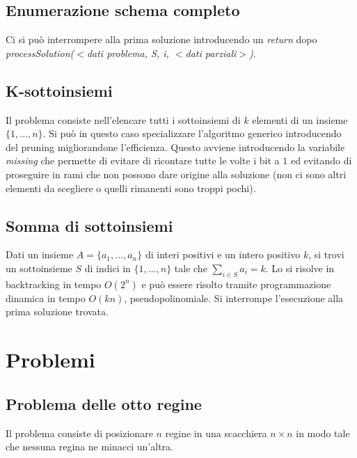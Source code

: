 \subsection{Enumerazione schema completo}

Ci si pu\`o interrompere alla prima soluzione introducendo un \emph{return} dopo \emph{processSolution($<$dati problema, S, i, $<$dati parziali$>$)}.
\subsection{K-sottoinsiemi}
Il problema consiste nell'elencare tutti i sottoinsiemi di $k$ elementi di un insieme $\{1, \dots, n\}$. Si pu\`o in questo caso specializzare l'algoritmo generico introducendo del
pruning migliorandone l'efficienza. Questo avviene introducendo la variabile \emph{missing} che permette di evitare di ricontare tutte le volte i bit a $1$ ed evitando di proseguire
in rami che non possono dare origine alla soluzione (non ci sono altri elementi da scegliere o quelli rimanenti sono troppi pochi).\\

\subsection{Somma di sottoinsiemi}
Dati un insieme $A = \{a_1, \dots, a_n\}$ di interi positivi e un intero positivo $k$, si trovi un sottoinsieme $S$ di indici in $\{1, \dots, n\}$ tale che 
$\sum\limits_{i\in S}a_i = k$. Lo si risolve in backtracking in tempo $O(2^n)$ e pu\`o essere risolto tramite programmazione dinamica in tempo $O(kn)$, pseudopolinomiale. Si interrompe
l'esecuzione alla prima soluzione trovata.\\

\section{Problemi}
\subsection{Problema delle otto regine}
Il problema consiste di posizionare $n$ regine in una scacchiera $n\times n$ in modo tale che nessuna regina ne minacci un'altra.
